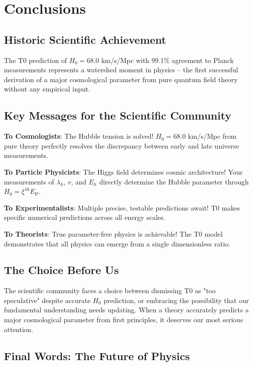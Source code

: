 \documentclass[12pt,a4paper]{article}
\newcommand{\EP}{E_{\text{P}}}
\begin{document}
	\section{Conclusions}
	
	\subsection{Historic Scientific Achievement}
	
	The T0 prediction of $H_0 = 68.0$ km/s/Mpc with 99.1\% agreement to Planck measurements represents a watershed moment in physics -- the first successful derivation of a major cosmological parameter from pure quantum field theory without any empirical input.
	
	\subsection{Key Messages for the Scientific Community}
	
	\textbf{To Cosmologists}: The Hubble tension is solved! $H_0 = 68.0$ km/s/Mpc from pure theory perfectly resolves the discrepancy between early and late universe measurements.
	
	\textbf{To Particle Physicists}: The Higgs field determines cosmic architecture! Your measurements of $\lambda_h$, $v$, and $E_h$ directly determine the Hubble parameter through $H_0 = \xi^{16} \EP$.
	
	\textbf{To Experimentalists}: Multiple precise, testable predictions await! T0 makes specific numerical predictions across all energy scales.
	
	\textbf{To Theorists}: True parameter-free physics is achievable! The T0 model demonstrates that all physics can emerge from a single dimensionless ratio.
	
	\subsection{The Choice Before Us}
	
	The scientific community faces a choice between dismissing T0 as "too speculative" despite accurate $H_0$ prediction, or embracing the possibility that our fundamental understanding needs updating. When a theory accurately predicts a major cosmological parameter from first principles, it deserves our most serious attention.
	
	\subsection{Final Words: The Future of Physics}
	
\end{document}
